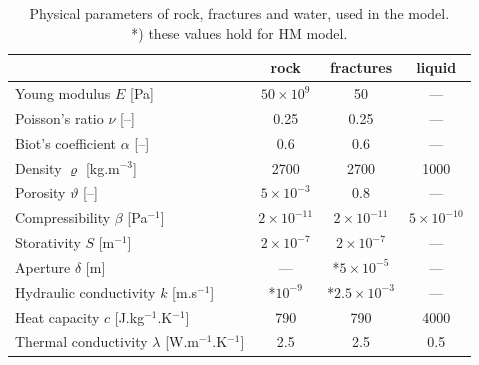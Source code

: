 \documentclass{article}
\begin{document}
\begin{table}
\centering
\begin{tabular}{|l|c|c|c|}
\hline
 & rock & fractures & liquid\\\hline
Young modulus $E$ [Pa] & $50\times10^9$ & 50 & --- \\
Poisson's ratio $\nu$ [--] & 0.25 & 0.25 & --- \\
Biot's coefficient $\alpha$ [--] & 0.6 & 0.6 & --- \\
\hline
Density $\varrho$ [kg.m${}^{-3}$] & 2700 & 2700 & 1000 \\
Porosity $\vartheta$ [--] & $5\times10^{-3}$ & $0.8$ & --- \\
Compressibility $\beta$ [Pa${}^{-1}$] & $2\times10^{-11}$ & $2\times10^{-11}$ & $5\times10^{-10}$ \\
Storativity $S$ [m${}^{-1}$] & $2\times10^{-7}$ & $2\times10^{-7}$ & --- \\
Aperture $\delta$ [m] & --- & *$5\times10^{-5}$ & --- \\
Hydraulic conductivity $k$ [m.s${}^{-1}$] & *$10^{-9}$ & *$2.5\times10^{-3}$ & ---\\
\hline
Heat capacity $c$ [J.kg${}^{-1}$.K${}^{-1}$] & 790 & 790 & 4000 \\
Thermal conductivity $\lambda$ [W.m${}^{-1}$.K${}^{-1}$] & 2.5 & 2.5 & 0.5 \\
\hline
\end{tabular}
\caption{Physical parameters of rock, fractures and water, used in the model. \\ *) these values hold for HM model.}
\label{tab:params}
\end{table}






\end{document}
